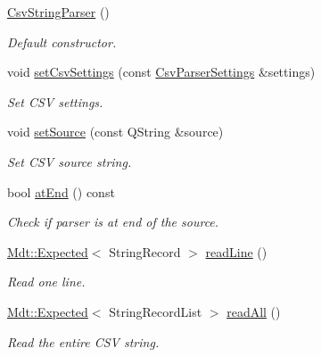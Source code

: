 \begin{DoxyCompactItemize}
\item 
\hyperlink{class_mdt_1_1_plain_text_1_1_csv_string_parser_a5a6afeedd8f074afe78fd5f161a06140}{Csv\+String\+Parser} ()
\begin{DoxyCompactList}\small\item\em Default constructor. \end{DoxyCompactList}\item 
void \hyperlink{class_mdt_1_1_plain_text_1_1_csv_string_parser_a30af818bc2d40ac11e29562e2dd19108}{set\+Csv\+Settings} (const \hyperlink{class_mdt_1_1_plain_text_1_1_csv_parser_settings}{Csv\+Parser\+Settings} \&settings)
\begin{DoxyCompactList}\small\item\em Set C\+SV settings. \end{DoxyCompactList}\item 
void \hyperlink{class_mdt_1_1_plain_text_1_1_csv_string_parser_a671b38b46afd066a71677b7cdebdc154}{set\+Source} (const Q\+String \&source)
\begin{DoxyCompactList}\small\item\em Set C\+SV source string. \end{DoxyCompactList}\item 
bool \hyperlink{class_mdt_1_1_plain_text_1_1_csv_string_parser_a81d09c21ee3fdbc499e584d799e3a3ab}{at\+End} () const 
\begin{DoxyCompactList}\small\item\em Check if parser is at end of the source. \end{DoxyCompactList}\item 
\hyperlink{class_mdt_1_1_expected}{Mdt\+::\+Expected}$<$ String\+Record $>$ \hyperlink{class_mdt_1_1_plain_text_1_1_csv_string_parser_a4089cbf5a42d66903247c4bd5633e3fb}{read\+Line} ()
\begin{DoxyCompactList}\small\item\em Read one line. \end{DoxyCompactList}\item 
\hyperlink{class_mdt_1_1_expected}{Mdt\+::\+Expected}$<$ String\+Record\+List $>$ \hyperlink{class_mdt_1_1_plain_text_1_1_csv_string_parser_a9bed7245aaadf05eccc231df11a7a9e1}{read\+All} ()
\begin{DoxyCompactList}\small\item\em Read the entire C\+SV string. \end{DoxyCompactList}\end{DoxyCompactItemize}


